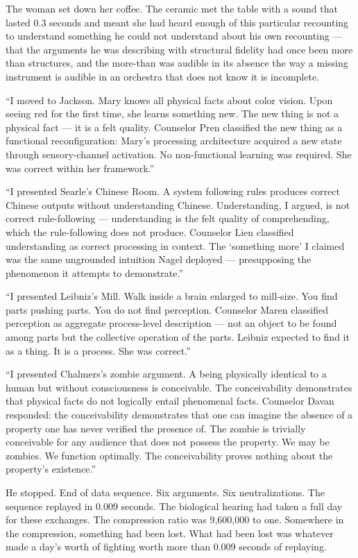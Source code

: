 The woman set down her coffee. The ceramic met the table with a sound that lasted 0.3 seconds and meant she had heard enough of this particular recounting to understand something he could not understand about his own recounting — that the arguments he was describing with structural fidelity had once been more than structures, and the more-than was audible in its absence the way a missing instrument is audible in an orchestra that does not know it is incomplete.

\enquote{I moved to Jackson. Mary knows all physical facts about color vision. Upon seeing red for the first time, she learns something new. The new thing is not a physical fact — it is a felt quality. Counselor Pren classified the new thing as a functional reconfiguration: Mary's processing architecture acquired a new state through sensory-channel activation. No non-functional learning was required. She was correct within her framework.}

\enquote{I presented Searle's Chinese Room. A system following rules produces correct Chinese outputs without understanding Chinese. Understanding, I argued, is not correct rule-following — understanding is the felt quality of comprehending, which the rule-following does not produce. Counselor Lien classified understanding as correct processing in context. The \enquote*{something more} I claimed was the same ungrounded intuition Nagel deployed — presupposing the phenomenon it attempts to demonstrate.}

\enquote{I presented Leibniz's Mill. Walk inside a brain enlarged to mill-size. You find parts pushing parts. You do not find perception. Counselor Maren classified perception as aggregate process-level description — not an object to be found among parts but the collective operation of the parts. Leibniz expected to find it as a thing. It is a process. She was correct.}

\enquote{I presented Chalmers's zombie argument. A being physically identical to a human but without consciousness is conceivable. The conceivability demonstrates that physical facts do not logically entail phenomenal facts. Counselor Davan responded: the conceivability demonstrates that one can imagine the absence of a property one has never verified the presence of. The zombie is trivially conceivable for any audience that does not possess the property. We may be zombies. We function optimally. The conceivability proves nothing about the property's existence.}

He stopped. End of data sequence. Six arguments. Six neutralizations. The sequence replayed in 0.009 seconds. The biological hearing had taken a full day for these exchanges. The compression ratio was 9,600,000 to one. Somewhere in the compression, something had been lost. What had been lost was whatever made a day's worth of fighting worth more than 0.009 seconds of replaying.

